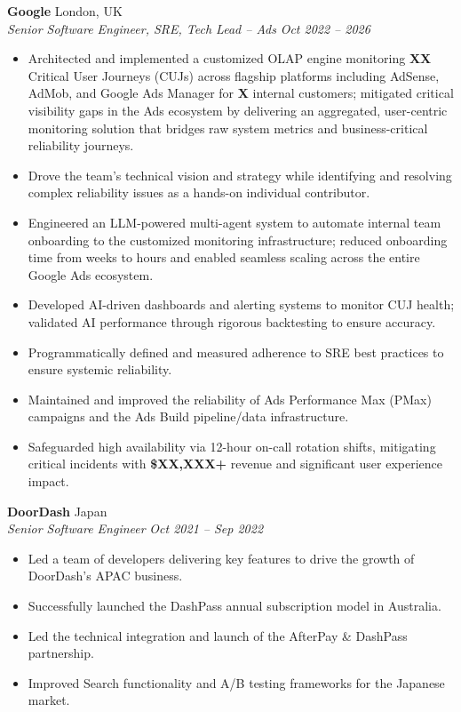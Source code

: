 \documentclass[10pt,a4paper]{article}
\newcommand{\entry}[4]{
  \textbf{#1} \hfill #2 \\
  \textit{#3} \hfill \textit{#4}
}
\begin{document}
\entry{Google}{London, UK}{Senior Software Engineer, SRE, Tech Lead -- Ads}{Oct 2022 -- 2026}
\begin{itemize}[noitemsep, leftmargin=*]
    \item Architected and implemented a customized OLAP engine monitoring \textbf{XX} Critical User Journeys (CUJs) across flagship platforms including AdSense, AdMob, and Google Ads Manager for \textbf{X} internal customers; mitigated critical visibility gaps in the Ads ecosystem by delivering an aggregated, user-centric monitoring solution that bridges raw system metrics and business-critical reliability journeys.
    \item Drove the team's technical vision and strategy while identifying and resolving complex reliability issues as a hands-on individual contributor.
    \item Engineered an LLM-powered multi-agent system to automate internal team onboarding to the customized monitoring infrastructure; reduced onboarding time from weeks to hours and enabled seamless scaling across the entire Google Ads ecosystem.
    \item Developed AI-driven dashboards and alerting systems to monitor CUJ health; validated AI performance through rigorous backtesting to ensure accuracy.
    \item Programmatically defined and measured adherence to SRE best practices to ensure systemic reliability.
    \item Maintained and improved the reliability of Ads Performance Max (PMax) campaigns and the Ads Build pipeline/data infrastructure.
    \item Safeguarded high availability via 12-hour on-call rotation shifts, mitigating critical incidents with \textbf{\$XX,XXX+} revenue and significant user experience impact.
\end{itemize}
\vspace{3pt}

\entry{DoorDash}{Japan}{Senior Software Engineer}{Oct 2021 -- Sep 2022}
\begin{itemize}[noitemsep, leftmargin=*]
    \item Led a team of developers delivering key features to drive the growth of DoorDash's APAC business.
    \item Successfully launched the DashPass annual subscription model in Australia.
    \item Led the technical integration and launch of the AfterPay \& DashPass partnership.
    \item Improved Search functionality and A/B testing frameworks for the Japanese market.
\end{itemize}
\vspace{3pt}
\end{document}
